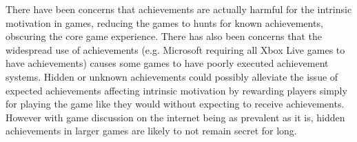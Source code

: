 There have been concerns\citep{Carvalho, Hecker} that achievements are actually harmful for the intrinsic motivation in games, reducing the games to hunts for known achievements, obscuring the core game experience. There has also been concerns\citep{Hamari} that the widespread use of achievements (e.g. Microsoft requiring all Xbox Live games to have achievements) causes some games to have poorly executed achievement systems. Hidden or unknown achievements could possibly alleviate the issue of expected achievements affecting intrinsic motivation by rewarding players simply for playing the game like they would without expecting to receive achievements. However with game discussion on the internet being as prevalent as it is, hidden achievements in larger games are likely to not remain secret for long.